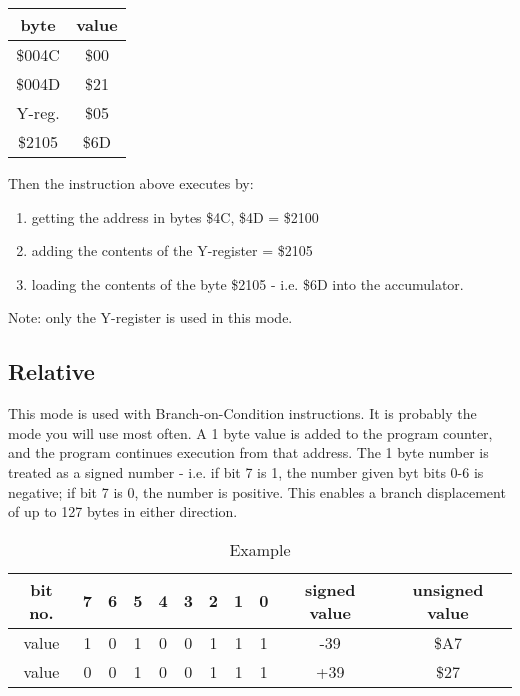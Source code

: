 \documentclass{article}
\begin{document}
  \begin{table}[h!]
  \centering
  \begin{tabular}{|c c|}
  \hline       
  byte   &   value \\
  \hline
  \$004C   &  \$00 \\
  \$004D   &  \$21 \\
  Y-reg.  &  \$05 \\
  \$2105   &  \$6D \\
  \hline
  \end{tabular}
  \end{table}

  Then the instruction above executes by:
  \begin{enumerate}
  \item   getting the address in bytes \$4C, \$4D = \$2100
  \item  adding the contents of the Y-register = \$2105
  \item loading the contents of the byte \$2105 - i.e. \$6D into the
        accumulator.
  \end{enumerate}
  Note: only the Y-register is used in this mode.

  \subsection{Relative}
  This mode is used with Branch-on-Condition instructions. It is probably
  the mode you will use most often. A 1 byte value is added to the program
  counter, and the program continues execution from that address. The 1
  byte number is treated as a signed number - i.e. if bit 7 is 1, the number
  given byt bits 0-6 is negative; if bit 7 is 0, the number is positive. This
  enables a branch displacement of up to 127 bytes in either direction.

  \begin{table}[h!]
  \centering
  \caption{Example}
  \begin{tabular}{|c|c c c c c c c c|c|c|}
  \hline
  bit no. & 7 & 6 & 5 & 4 & 3 & 2 & 1 & 0  &  signed value     &     unsigned value \\
  \hline
  value  &  1 & 0 & 1 & 0 & 0 & 1 & 1 & 1  &  -39          &         \$A7 \\
  value  &  0 & 0 & 1 & 0 & 0 & 1 & 1 & 1  &  +39          &         \$27 \\
  \hline
  \end{tabular}
  \end{table}
\end{document}
